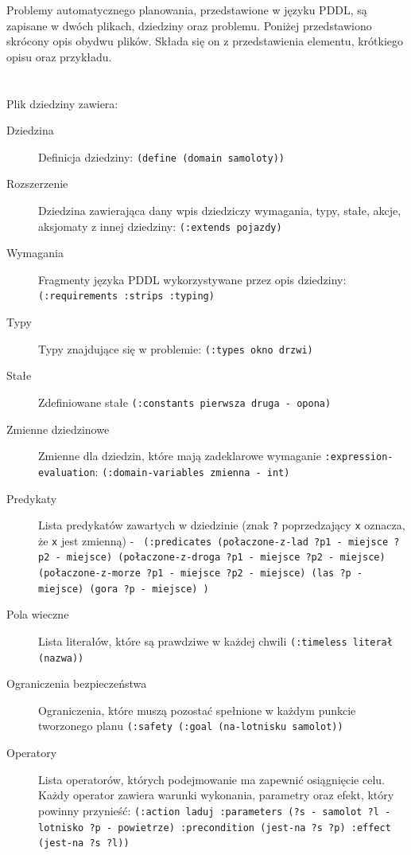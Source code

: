 Problemy automatycznego planowania, przedstawione w języku PDDL, są zapisane w dwóch plikach, dziedziny oraz problemu. Poniżej przedstawiono skrócony opis obydwu plików. Składa się on z przedstawienia elementu, krótkiego opisu oraz przykładu.
\\\\\\
Plik dziedziny zawiera:
  \begin{description}
\item[Dziedzina] Definicja dziedziny: \texttt{(define (domain samoloty))}
\item[Rozszerzenie] Dziedzina zawierająca dany wpis dziedziczy wymagania, typy, stałe, akcje, aksjomaty z innej dziedziny: \texttt{(:extends pojazdy) }
\item[Wymagania] Fragmenty języka PDDL wykorzystywane przez opis dziedziny: \texttt{(:requirements :strips :typing)}
\item[Typy] Typy znajdujące się w problemie: \texttt{(:types okno drzwi)}
\item[Stałe] Zdefiniowane stałe \texttt{(:constants pierwsza druga - opona)}
\item[Zmienne dziedzinowe] Zmienne dla dziedzin, które mają zadeklarowe wymaganie \texttt{:expression-evaluation}: \texttt{(:domain-variables zmienna - int)}
\item[Predykaty] Lista predykatów zawartych w dziedzinie (znak \texttt{?} poprzedzający \texttt{x} oznacza, że \texttt{x} jest zmienną) -  \texttt{  (:predicates 
   (połaczone-z-lad ?p1 - miejsce ?p2 - miejsce) 
   (połaczone-z-droga ?p1 - miejsce ?p2 - miejsce) 
   (połaczone-z-morze ?p1 - miejsce ?p2 - miejsce) 
   (las ?p - miejsce) 
   (gora ?p - miejsce) )}
\item[Pola wieczne] Lista literałów, które są prawdziwe w każdej chwili \texttt{(:timeless literał (nazwa))}
\item[Ograniczenia bezpieczeństwa] Ograniczenia, które muszą pozostać spełnione w każdym punkcie tworzonego planu \texttt{(:safety (:goal (na-lotnisku samolot))}
\item[Operatory] Lista operatorów, których podejmowanie ma zapewnić osiągnięcie celu. Każdy operator zawiera warunki wykonania, parametry oraz efekt, który powinny przynieść: \texttt{(:action laduj :parameters (?s - samolot ?l - lotnisko ?p - powietrze) :precondition (jest-na ?s ?p) :effect (jest-na ?s ?l)) }\\
\end{description}


